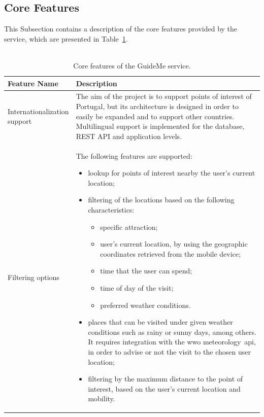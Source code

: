 \subsection{Core Features}
\label{subsec:cf}
This Subsection contains a description of the core features provided by the service, which are presented in Table~\ref{tab:coreFeatures}.\\
\\
\newpage
\begin{center}
    \begin{longtable}{ | p{3.5cm} | p{11.1cm} |}
    \caption{Core features of the GuideMe service.}
    \label{tab:coreFeatures}
	\\
    \hline
    \textbf{Feature Name} & \textbf{Description}\\ \hline
    \hline
    \specialcell[t]{Internationalization\\support} & 
    The aim of the project is to support points of interest of Portugal, but its architecture is designed in order to easily be expanded and to support other countries. Multilingual support is implemented for the database, REST API and application levels. \\ 
    \hline
    
    Filtering options &
    The following features are supported:
	\begin{itemize}
	\item lookup for points of interest nearby the user's current location;
	\item filtering of the locations based on the following characteristics:
	\begin{itemize}
		\item specific attraction;
		\item user's current location, by using the geographic coordinates retrieved from the mobile device;
		\item time that the user can spend;
		\item time of day of the visit;
		\item preferred weather conditions.
	\end{itemize}
	\item places that can be visited under given weather conditions such as rainy or sunny days, among others. It requires integration with the \gls{wwo} meteorology~\gls{api}, in order to advise or not the visit to the chosen user location;
	\item filtering by the maximum distance to the point of interest, based on the user's current location and mobility.
	\end{itemize}
    \\ 
    \hline
    

\end{longtable}
\end{center}
